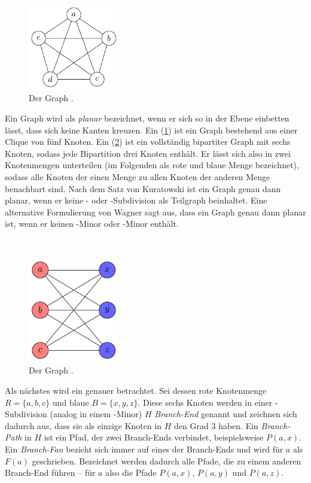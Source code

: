 \begin{figure}
  \includegraphics[width=4cm]{bilder/K_5.pdf}
  \caption{Der Graph \kf.}
  \label{fig:K5}
\end{figure}
Ein Graph wird als \emph{planar} bezeichnet, wenn er sich so in der Ebene einbetten lässt, dass sich keine Kanten kreuzen.
Ein \kf (\sAbb \ref{fig:K5}) ist ein Graph bestehend aus einer Clique von fünf Knoten.
Ein \kdd (\sAbb \ref{fig:K33}) ist ein vollständig bipartiter Graph mit sechs Knoten, sodass jede Bipartition drei Knoten enthält.
Er lässt sich also in zwei Knotenmengen unterteilen (im Folgenden als rote und blaue Menge bezeichnet), sodass alle Knoten der einen Menge zu allen Knoten der anderen Menge benachbart sind.
Nach dem Satz von Kuratowski ist ein Graph genau dann planar, wenn er keine \kf- oder \kdd-Subdivision als Teilgraph beinhaltet.
Eine alternative Formulierung von Wagner \cite{Wag37} sagt aus, dass ein Graph genau dann planar ist, wenn er keinen \kf-Minor oder \kdd-Minor enthält\cite{Die12}.

\ \\
\begin{figure}
  \includegraphics[width=4cm]{bilder/K_33.pdf}
  \caption{Der Graph \kdd.}
  \label{fig:K33}
\end{figure}
Als nächstes wird ein \kdd genauer betrachtet.
Sei dessen rote Knotenmenge $R = \{a, b, c\}$ und blaue $B = \{x, y, z\}$.
Diese sechs Knoten werden in einer \kdd-Subdivision (analog in einem \kdd-Minor) $H$ \emph{Branch-End} genannt und zeichnen sich dadurch aus, dass sie als einzige Knoten in $H$ den Grad 3 haben.
Ein \emph{Branch-Path} in $H$ ist ein Pfad, der zwei Branch-Ends verbindet, beispielsweise $P(a, x)$.
Ein \emph{Branch-Fan} bezieht sich immer auf eines der Branch-Ends und wird \zB für $a$ als $F(a)$ geschrieben.
Bezeichnet werden dadurch alle Pfade, die zu einem anderen Branch-End führen -- für $a$ also die Pfade $P(a, x)$, $P(a, y)$ und $P(a, z)$.


